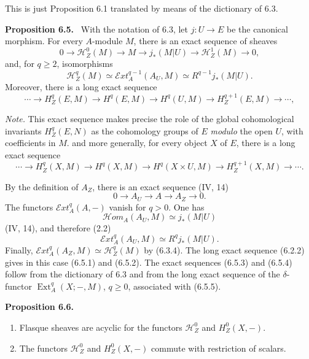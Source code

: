 \documentclass[11pt]{article}
\newcommand{\Hh}{\mathcal{H}}
\newcommand{\Ext}{\operatorname{Ext}}
\newcommand{\Hhom}{\mathcal{H}om}
\newcommand{\Eext}{\mathcal{E}xt}
\newenvironment{statement}[1]{\par\medskip\noindent\textbf{#1.}\ }{\par\medskip}
\begin{document}
This is just Proposition 6.1 translated by means of the dictionary of 6.3.

\begin{statement}{Proposition 6.5}
With the notation of 6.3, let $j:U\to E$ be the canonical morphism. For every $A$-module $M$, there is an exact sequence of sheaves
\begin{equation*}
        0\to \Hh_Z^0(M)\to M\to j_*(M|U)\to \Hh_Z^1(M)\to 0,\tag{6.5.1}
\end{equation*}
and, for $q\geq 2$, isomorphisms
\begin{equation*}
        \Hh_Z^q(M)\simeq \Eext_A^{q-1}(A_U,M)\simeq R^{q-1}j_*(M|U).\tag{6.5.2}
\end{equation*}
Moreover, there is a long exact sequence
\begin{equation*}
\cdots\to H_Z^q(E,M)\to H^q(E,M)\to H^q(U,M)\to H_Z^{q+1}(E,M)\to\cdots,\tag{6.5.3}
\end{equation*}
\par\noindent\emph{Note.} This exact sequence makes precise the role of the global cohomological invariants $H_Z^q(E,N)$ as the cohomology groups of $E$ \emph{modulo} the open $U$, with coefficients in $M$.
and more generally, for every object $X$ of $E$, there is a long exact sequence
\begin{equation*}
\cdots\to H_Z^q(X,M)\to H^q(X,M)\to H^q(X\times U,M)\to H_Z^{q+1}(X,M)\to\cdots.\tag{6.5.4}
\end{equation*}
\end{statement}

By the definition of $A_Z$, there is an exact sequence (IV, 14)
\begin{equation*}
        0\to A_U\to A\to A_Z\to 0.\tag{6.5.5}
\end{equation*}
The functors $\Eext_A^q(A,-)$ vanish for $q>0$. One has
\[
        \Hhom_A(A_U,M)\simeq j_*(M|U)
\]
(IV, 14), and therefore (2.2)
\[
        \Eext_A^q(A_U,M)\simeq R^qj_*(M|U).
\]
Finally, $\Eext_A^q(A_Z,M)\simeq \Hh_Z^q(M)$ by (6.3.4). The long exact sequence (6.2.2) gives in this case (6.5.1) and (6.5.2). The exact sequences (6.5.3) and (6.5.4) follow from the dictionary of 6.3 and from the long exact sequence of the $\delta$-functor $\Ext_A^q(X;- ,M)$, $q\geq 0$, associated with (6.5.5).

\begin{statement}{Proposition 6.6}
\begin{enumerate}[label=\arabic*)]
\item Flasque sheaves are acyclic for the functors $\Hh_Z^0$ and $H_Z^0(X,-)$.
\item The functors $\Hh_Z^0$ and $H_Z^0(X,-)$ commute with restriction of scalars.
\end{enumerate}
\end{statement}
\end{document}
